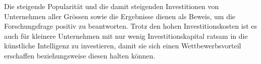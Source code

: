 {    Die steigende Popularität und die damit steigenden Investitionen von Unternehmen aller Grössen sowie die Ergebnisse dienen als Beweis, um die Forschungsfrage positiv zu beantworten. Trotz den hohen Investitionskosten ist es auch für kleinere Unternehmen mit nur wenig Investitionskapital ratsam in die künstliche Intelligenz zu investieren, damit sie sich einen Wettbewerbsvorteil erschaffen beziehungsweise diesen halten können.
    
}

\newpage

\tableofcontents

\cleardoublepage


\cleardoublepage


